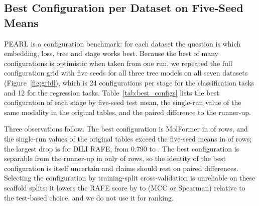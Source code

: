 \documentclass[pdflatex,sn-mathphys-num]{sn-jnl}%
\begin{document}
\begin{table}[!ht]
\centering
\caption{DILI, full same-tree comparison. Mean $\pm$ SD of the test MCC over five seeds for each embedding and loss combination. Bold: best of the three stages within the row and tree. The last two rows give the difference pooled over rows and seeds with a paired bootstrap interval.}
\label{tab:full_dili}
\scriptsize

\end{table}

\begin{table}[!ht]
\centering
\caption{Caco-2, full same-tree comparison (test Spearman, mean $\pm$ SD over five seeds; layout as in Table~\ref{tab:full_dili}).}
\label{tab:full_caco2}
\scriptsize

\end{table}

\begin{table}[!ht]
\centering
\caption{BBBP, full same-tree comparison (test MCC, mean $\pm$ SD over five seeds; layout as in Table~\ref{tab:full_dili}).}
\label{tab:full_bbbp}
\scriptsize

\end{table}

\subsection{Best Configuration per Dataset on Five-Seed Means}\label{sec:best_configs}
PEARL is a configuration benchmark: for each dataset the question is which embedding, loss, tree and stage works best. Because the best of many configurations is optimistic when taken from one run, we repeated the full configuration grid with five seeds for all three tree models on all seven datasets (Figure~\ref{fig:grid}), which is 24 configurations per stage for the classification tasks and 12 for the regression tasks. Table~\ref{tab:best_configs} lists the best configuration of each stage by five-seed test mean, the single-run value of the same modality in the original tables, and the paired difference to the runner-up.

Three observations follow. The best configuration is MolFormer in \nmf{} of \nrows{} rows, and the single-run values of the original tables exceed the five-seed means in \nsr{} of \nrows{} rows; the largest drop is for DILI RAFE, from 0.790 to \mDILIRAFE{}. The best configuration is separable from the runner-up in only \nsep{} of \nrows{} rows, so the identity of the best configuration is itself uncertain and claims should rest on paired differences. Selecting the configuration by training-split cross-validation is unreliable on these scaffold splits: it lowers the RAFE score by \gaplo{} to \gaphi{} (MCC or Spearman) relative to the test-based choice, and we do not use it for ranking.
\end{document}
